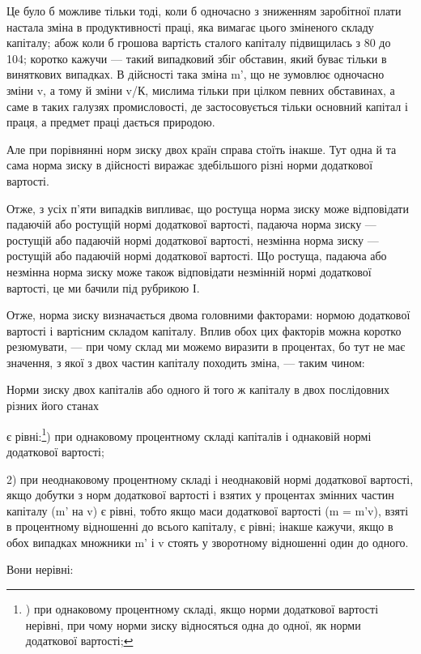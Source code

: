 Це було б можливе тільки тоді, коли б одночасно з зниженням
заробітної плати настала зміна в продуктивності праці, яка
вимагає цього зміненого складу капіталу; абож коли б грошова вартість
сталого капіталу підвищилась з 80 до 104; коротко кажучи —
такий випадковий збіг обставин, який буває тільки в виняткових
випадках. В дійсності така зміна m', що не зумовлює одночасно
зміни v, а тому й зміни v/К, мислима тільки при цілком певних
обставинах, а саме в таких галузях промисловості, де застосовується
тільки основний капітал і праця, а предмет праці дається
природою.

Але при порівнянні норм зиску двох країн справа стоїть
інакше. Тут одна й та сама норма зиску в дійсності виражає
здебільшого різні норми додаткової вартості.

Отже, з усіх п’яти випадків випливає, що ростуща норма
зиску може відповідати падаючій або ростущій нормі додаткової
вартості, падаюча норма зиску — ростущій або падаючій
нормі додаткової вартості, незмінна норма зиску — ростущій або
падаючій нормі додаткової вартості. Що ростуща, падаюча або
незмінна норма зиску може також відповідати незмінній нормі
додаткової вартості, це ми бачили під рубрикою І.

Отже, норма зиску визначається двома головними факторами:
нормою додаткової вартості і вартісним складом капіталу.
Вплив обох цих факторів можна коротко резюмувати, — при чому
склад ми можемо виразити в процентах, бо тут не має значення,
з якої з двох частин капіталу походить зміна, — таким чином:

Норми зиску двох капіталів або одного й того ж капіталу
в двох послідовних різних його станах

є рівні:\footnote{
) при однаковому процентному складі, якщо норми додаткової
вартості нерівні, при чому норми зиску відносяться одна до
одної, як норми додаткової вартості;
}) при однаковому процентному складі капіталів і однаковій
нормі додаткової вартості;

2) при неоднаковому процентному складі і неоднаковій нормі
додаткової вартості, якщо добутки з норм додаткової вартості
і взятих у процентах змінних частин капіталу (m' на v) є рівні,
тобто якщо маси додаткової вартості (m = m'v), взяті в процентному
відношенні до всього капіталу, є рівні; інакше кажучи,
якщо в обох випадках множники m' і v стоять у зворотному
відношенні один до одного.

Вони нерівні:
\parbreak{}  %
